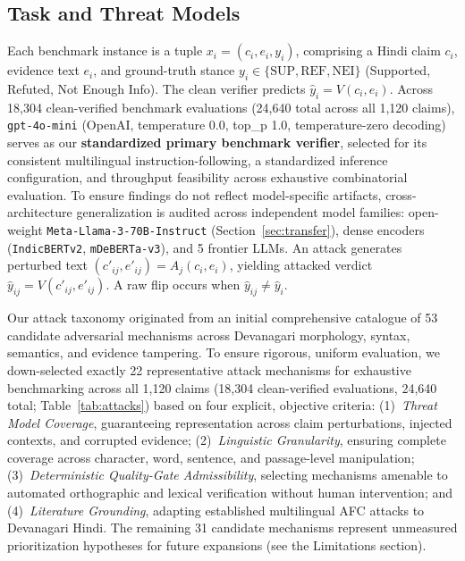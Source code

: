 \documentclass[11pt]{article}
\begin{document}
\subsection{Task and Threat Models}
Each benchmark instance is a tuple $x_i = (c_i, e_i, y_i)$, comprising a Hindi claim $c_i$, evidence text $e_i$, and ground-truth stance $y_i \in \{\mathrm{SUP}, \mathrm{REF}, \mathrm{NEI}\}$ (Supported, Refuted, Not Enough Info). The clean verifier predicts $\hat{y}_i = V(c_i, e_i)$. Across 18,304 clean-verified benchmark evaluations (24,640 total across all 1,120 claims), \texttt{gpt-4o-mini} (OpenAI, temperature 0.0, top\_p 1.0, temperature-zero decoding) serves as our \textbf{standardized primary benchmark verifier}, selected for its consistent multilingual instruction-following, a standardized inference configuration, and throughput feasibility across exhaustive combinatorial evaluation. To ensure findings do not reflect model-specific artifacts, cross-architecture generalization is audited across independent model families: open-weight \texttt{Meta-Llama-3-70B-Instruct} (Section~\ref{sec:transfer}), dense encoders (\texttt{IndicBERTv2}, \texttt{mDeBERTa-v3}), and 5 frontier LLMs. An attack generates perturbed text $(c'_{ij}, e'_{ij}) = A_j(c_i, e_i)$, yielding attacked verdict $\hat{y}_{ij} = V(c'_{ij}, e'_{ij})$. A raw flip occurs when $\hat{y}_{ij} \neq \hat{y}_i$.

Our attack taxonomy originated from an initial comprehensive catalogue of 53 candidate adversarial mechanisms across Devanagari morphology, syntax, semantics, and evidence tampering. To ensure rigorous, uniform evaluation, we down-selected exactly 22 representative attack mechanisms for exhaustive benchmarking across all 1,120 claims (18,304 clean-verified evaluations, 24,640 total; Table~\ref{tab:attacks}) based on four explicit, objective criteria: (1)~\emph{Threat Model Coverage}, guaranteeing representation across claim perturbations, injected contexts, and corrupted evidence; (2)~\emph{Linguistic Granularity}, ensuring complete coverage across character, word, sentence, and passage-level manipulation; (3)~\emph{Deterministic Quality-Gate Admissibility}, selecting mechanisms amenable to automated orthographic and lexical verification without human intervention; and (4)~\emph{Literature Grounding}, adapting established multilingual AFC attacks \citep{wang2021textflint,du2022synthetic,fact2fiction2026,abdelnabi23usenix} to Devanagari Hindi. The remaining 31 candidate mechanisms represent unmeasured prioritization hypotheses for future expansions (see the Limitations section).
\end{document}
